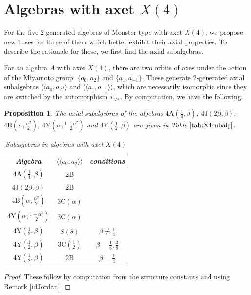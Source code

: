 \documentclass[11pt, a4paper]{article}
\theoremstyle{plain}
\newtheorem{proposition}[theorem]{Proposition}
\theoremstyle{definition}
\newcommand\al{\alpha}
\newcommand\bt{\beta}
\newcommand\dl{\delta}
\newcommand\lla{\langle\!\langle}
\newcommand\rra{\rangle\!\rangle}
\newcommand{\A}{\mathrm{A}}
\newcommand{\B}{\mathrm{B}}
\newcommand{\C}{\mathrm{C}}
\newcommand{\J}{\mathrm{J}}
\newcommand{\Y}{\mathrm{Y}}
\newcommand{\0}{\overline{0}}
\newcommand{\2}{\overline{2}}
\newcommand{\half}{{\tau_{\sfrac{1}{2}}}} %
\newcommand{\1}{\mathbbm{1}}
\begin{document}

\section{Algebras with axet $X(4)$}

For the five $2$-generated algebras of Monster type with axet $X(4)$, we propose new bases for three of them which better exhibit their axial properties.   To describe the rationale for these, we first find the axial subalgebras.

For an algebra $A$ with axet $X(4)$, there are two orbits of axes under the action of the Miyamoto group: $\{ a_0, a_2 \}$ and $\{ a_1, a_{-1} \}$.  These generate $2$-generated axial subalgebras $\lla a_0, a_2 \rra$ and $\lla a_1, a_{-1} \rra$, which are necessarily isomorphic since they are switched by the automorphism $\half$.  By computation, we have the following.

\begin{proposition}
The axial subalgebras of the algebras $4\A(\frac{1}{4}, \bt)$, $4\J(2\bt, \bt)$, $4\B(\al, \frac{\al^2}{2})$, $4\Y(\al, \frac{1-\al^2}{2})$ and $4\Y(\frac{1}{2}, \bt)$ are given in Table $\ref{tab:X4subalg}$.
\begin{table}[h!tb]
\centering
\begin{tabular}{ccc}
\hline
Algebra & $\lla a_0, a_2 \rra$ & conditions \\
\hline
$4\A(\frac{1}{4}, \bt)$ & $2\B$ & \\
$4\J(2\bt, \bt)$  & $2\B$ & \\
$4\B(\al, \frac{\al^2}{2})$ & $3\C(\al)$ & \\
$4\Y(\al, \frac{1-\al^2}{2})$ & $3\C(\al)$ & \\
$4\Y(\frac{1}{2}, \bt)$ & $S(\dl)$ & $\bt \neq \frac{1}{4}$ \\
$4\Y(\frac{1}{2}, \bt)$ & $3\C(\frac{1}{2})$ & $\bt = \frac{1}{8}, \frac{3}{8}$ \\
$4\Y(\frac{1}{2}, \bt)$ & $2\B$ & $\bt = \frac{1}{4}$ \\
\hline
\end{tabular}
\caption{Subalgebras in algebras with axet $X(4)$}\label{tab:X4subalg}
\end{table}
\end{proposition}
\begin{proof}
These follow by computation from the structure constants and using Remark \ref{idJordan}.
\end{proof}
\end{document}
